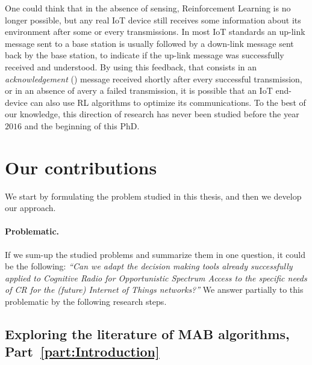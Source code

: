 One could think that in the absence of sensing, Reinforcement Learning is no longer possible, but any real IoT device still receives some information about its environment after some or every transmissions.
In most IoT standards an up-link message sent to a base station is usually followed by a down-link message sent back by the base station, to indicate if the up-link message was successfully received and understood.
%
By using this feedback, that consists in an \emph{acknowledgement} (\Ack) message received shortly after every successful transmission, or in an absence of \Ack{} avery a failed transmission, it is possible that an IoT end-device can also use RL algorithms to optimize its communications.
%
To the best of our knowledge, this direction of research has never been studied before the year $2016$ and the beginning of this PhD.


\section{Our contributions}
\label{sec:1:contributions}

We start by formulating the problem studied in this thesis, and then we develop our approach.

\paragraph{Problematic.}
%
If we sum-up the studied problems and summarize them in one question, it could be the following:
\emph{``Can we adapt the decision making tools already successfully applied to Cognitive Radio for Opportunistic Spectrum Access to the specific needs of CR for the (future) Internet of Things networks?''}
%
We answer partially to this problematic by the following research steps.


\subsection{Exploring the literature of MAB algorithms, Part~\ref{part:Introduction}}


